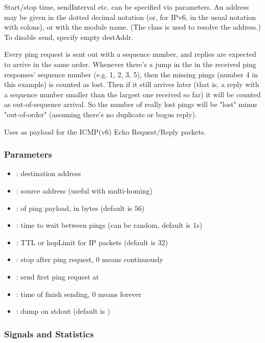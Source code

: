 Start/stop time, sendInterval etc. can be specified via parameters. An address
may be given in the dotted decimal notation (or, for IPv6, in the usual
notation with colons), or with the module name.
(The  class is used to resolve the address.)
To disable send, specify empty destAddr.

Every ping request is sent out with a sequence number, and replies are
expected to arrive in the same order. Whenever there's a jump in the
in the received ping responses' sequence number (e.g. 1, 2, 3, 5), then
the missing pings (number 4 in this example) is counted as lost.
Then if it still arrives later (that is, a reply with a sequence number
smaller than the largest one received so far) it will be counted as
out-of-sequence arrival. So the number of really lost pings will be
"lost" minus "out-of-order" (assuming there's no duplicate or bogus reply).

Uses  as payload for the ICMP(v6) Echo Request/Reply packets.

\subsubsection*{Parameters}

\begin{itemize}
  \item {}: destination address
  \item {}: source address (useful with multi-homing)
  \item {}: of ping payload, in bytes (default is 56)
  \item {}: time to wait between pings (can be random, default is 1s)
  \item {}: TTL or hopLimit for IP packets (default is 32)
  \item {}: stop after  ping request, 0 means continuously
  \item {}: send first ping request at 
  \item {}: time of finish sending, 0 means forever
  \item {}: dump on stdout (default is )
\end{itemize}

\subsubsection*{Signals and Statistics}

